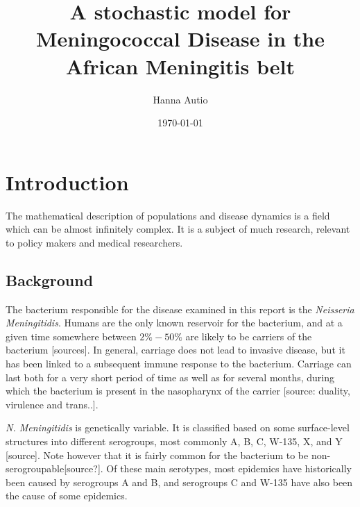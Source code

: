 \documentclass[10pt,a4paper]{article}
\author{Hanna Autio}
\title{A stochastic model for Meningococcal Disease in the African Meningitis belt} %
\date{\today}
\begin{document}
\maketitle
\thispagestyle{empty}
\cleardoublepage
\newpage
\setcounter{page}{1}



\section{Introduction}

The mathematical description of populations and disease dynamics is a field which can be almost infinitely complex. It is a subject of much research, relevant to policy makers and medical researchers.






\subsection{Background}

The bacterium responsible for the disease examined in this report is the \emph{Neisseria Meningitidis}. Humans are the only known reservoir for the bacterium, and at a given time somewhere between $2\% - 50\%$ are likely to be carriers of the bacterium [sources]. In general, carriage does not lead to invasive disease, but it has been linked to a subsequent immune response to the bacterium. Carriage can last both for a very short period of time as well as for several months, during which the bacterium is present in the nasopharynx of the carrier [source: duality, virulence and trans..].

\emph{N. Meningitidis} is genetically variable. It is classified based on some surface-level structures into different serogroups, most commonly A, B, C, W-135, X, and Y [source]. Note however that it is fairly common for the bacterium to be non-serogroupable[source?]. Of these main serotypes, most epidemics have historically been caused by serogroups A and B, and serogroups C and W-135 have also been the cause of some epidemics.
\end{document}
